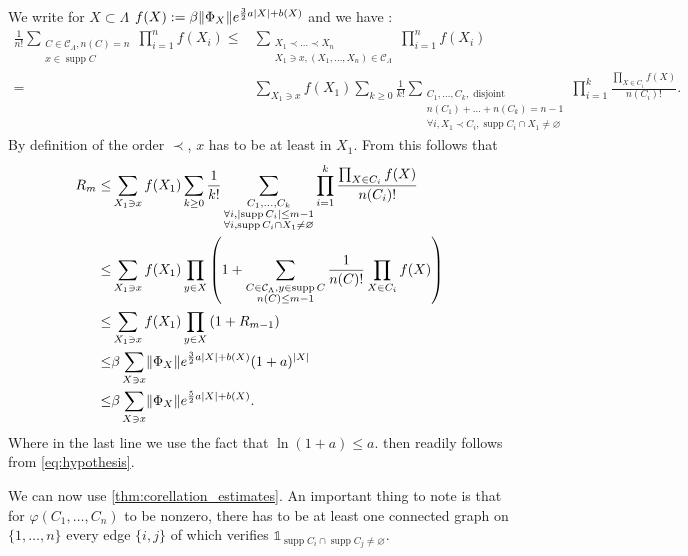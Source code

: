 \documentclass{article}
\DeclarePairedDelimiter\abs{\lvert}{\rvert}
\DeclarePairedDelimiter\norm{\lVert}{\rVert}
\DeclareMathOperator{\disj}{disjoint}
\DeclareMathOperator{\supp}{supp}
\begin{document}
 We write for $X\subset \Lambda$ $f(X):=\beta\norm{\Phi_X}e^{\frac 3 2 a\abs{X}+b(X)}$
 and we have :
 \begin{align*}
     \frac 1 {n!} \sum_{\substack{C\in\mathcal C_\Lambda,n(C)=n\\x\in\supp C}}\prod_{i=1}^{n}f(X_i)\leq& \sum_{\substack{X_1\prec\ldots\prec X_n\\X_1\ni x,(X_1,\ldots,X_n)\in\mathcal C_\Lambda}}\prod_{i=1}^{n}f(X_i)
     \\
     =&\sum_{X_1\ni x}f(X_1)\sum_{k\geq 0}\frac 1{k!}\sum_{\substack{C_1,\ldots,C_k,\disj\\n(C_1)+\ldots+n(C_k)=n-1
             \\\forall i, X_1\prec C_i,\supp C_i\cap X_1\neq \varnothing
         }}\prod_{i=1}^k\frac {\prod_{X\in C_i}f(X)}{n(C_i)!}.\end{align*}
     By definition of the order $\prec$, $x$ has to be at least in $X_1$.
     From this follows that
     \begin{align*}
     R_m \leq& \sum_{X_1\ni x}f(X_1)\sum_{k\geq 0}\frac 1{k!}\sum_{\substack{C_1,\ldots,C_k
             \\\forall i, \abs{\supp C_i}\leq m-1\\\forall i,\supp C_i\cap X_1\neq \varnothing
     }}\prod_{i=1}^k\frac {\prod_{X\in C_i}f(X)}{n(C_i)!}\\
 \leq& \sum_{X_1\ni x}f(X_1)\prod_{y\in X}\left(1+
  \sum_{\substack{C\in \mathcal C_\Lambda,y\in\supp C\\n(C)\leq m-1}}\frac{1}{n(C)!}\prod_{X\in C_i}{f(X)}
 \right)\\
 \leq &\sum_{X_1\ni x}f(X_1)\prod_{y\in X}\left(1+R_{m-1}\right)\\
 \leq & \beta\sum_{X\ni x}\norm{\Phi_{X}}e^{\frac 3 2 a\abs{X}+b(X)}(1+a)^{\abs{X}}\\
 \leq &\beta\sum_{X\ni x}\norm{\Phi_{X}}e^{\frac 5 2 a\abs{X}+b(X)}.
\end{align*}
Where in the last line we use the fact that $\ln(1+a)\leq a$.
 then readily follows from \cref{eq:hypothesis}.

We can now use \cref{thm:corellation_estimates}.
An important thing to note is that for $\varphi(C_1,\ldots,C_n)$ to be nonzero, there has to be at least one connected graph on $\{1,\ldots,n\}$ every edge $\{i,j\}$ of which verifies $\mathbb 1_{\supp C_i\cap \supp C_j\neq \varnothing}$.
\end{document}
